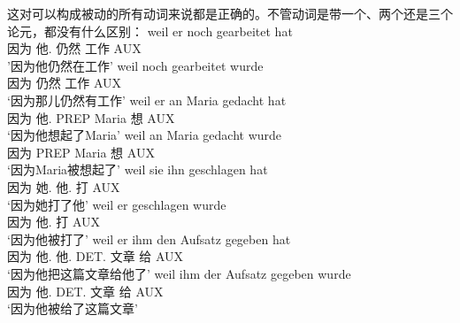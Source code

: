 \noindent
这对可以构成被动的所有动词来说都是正确的。不管动词是带一个、两个还是三个论元，都没有什么区别：
\eal
\label{beispiel-arbeiten}
\ex 
\gll weil er noch gearbeitet hat\\
	 因为 他.\nom{} 仍然 工作 AUX\\
\glt '因为他仍然在工作'
\ex 
\gll weil noch gearbeitet wurde\\
	 因为 仍然 工作 AUX\\
\glt `因为那儿仍然有工作'
\zl
\eal
\label{beispiel-denken}
\ex 
\gll weil er an Maria gedacht hat\\
	 因为 他.\nom{} PREP Maria 想 AUX\\
\glt `因为他想起了Maria'
\ex 
\gll weil an Maria gedacht wurde\\
	 因为 PREP Maria 想 AUX\\
\glt `因为Maria被想起了'
\zl
\eal
\ex 
\gll weil sie ihn geschlagen hat\\
	 因为 她.\nom{} 他.\acc{} 打 AUX\\
\glt `因为她打了他'
\ex 
\gll weil er geschlagen wurde\\
	 因为 他.\nom{} 打 AUX\\
\glt `因为他被打了'
\zl
\eal
\ex 
\gll weil er ihm den Aufsatz gegeben hat\\
      因为 他.\nom{} 他.\dat{} DET.\acc{} 文章 给 AUX\\
\glt `因为他把这篇文章给他了'
\ex 
\gll weil ihm der Aufsatz gegeben wurde\\
     因为 他.\dat{} DET.\nom{} 文章 给 AUX\\
\glt `因为他被给了这篇文章'
\zl

